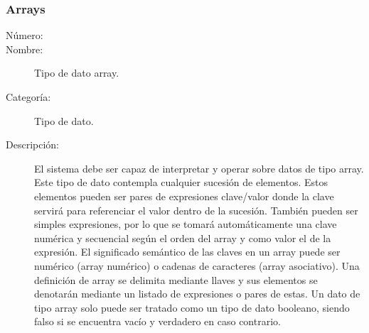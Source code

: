 \subsubsection{Arrays}
\begin{framed}
	\begin{description}
		\item [Número:] \cn
		\item [Nombre:] Tipo de dato array.
		\item [Categoría:] Tipo de dato.
		\item [Descripción:] El sistema debe ser capaz de interpretar y operar sobre datos de tipo array. Este tipo
		de dato contempla cualquier sucesión de elementos. Estos elementos pueden ser pares de expresiones clave/valor donde la clave servirá
		para referenciar el valor dentro de la sucesión. También pueden ser simples expresiones, por lo que se tomará automáticamente una clave
		numérica y secuencial según el orden del array y como valor el de la expresión. El significado semántico de las claves en un array puede
		ser numérico (array numérico) o cadenas de caracteres (array asociativo).  
		Una definición de array se delimita mediante llaves y sus elementos se denotarán mediante un listado de expresiones o pares de estas. Un dato de tipo array solo puede ser tratado como un tipo de dato booleano,
		siendo falso si se encuentra vacío y verdadero en caso contrario.
	\end {description}
\end{framed}
